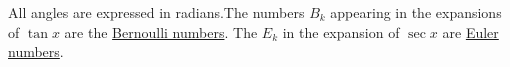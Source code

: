 \documentclass{notes}
\begin{document}
\begin{description}
All angles are expressed in radians.The numbers $B_k$
appearing in the expansions of $\tan x$ are the
\href{https://en.wikipedia.org/wiki/Bernoulli_number}{Bernoulli numbers}. The $E_k$ in the expansion  of $\sec x$ are
\href{https://en.wikipedia.org/wiki/Euler_number}{Euler numbers}. 
\end{description}





\end{document}
